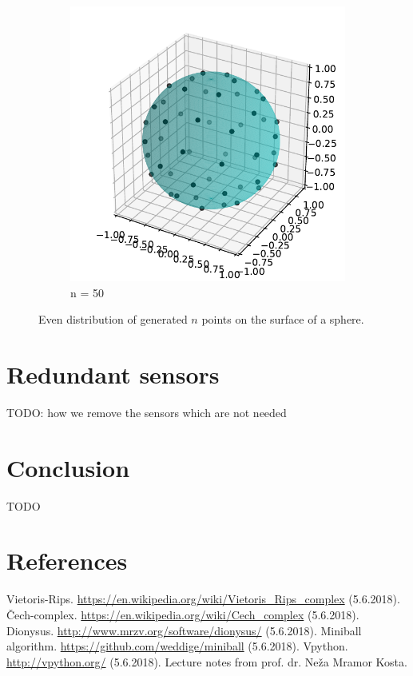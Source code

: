 \documentclass[a4paper, 12pt]{article}
\begin{document}
\begin{figure}[!ht]
\begin{subfigure}{.5\textwidth}
		\includegraphics[scale=0.75]{../images/generated1.pdf}
		\caption{n = 50}
	\end{subfigure}%
    \caption{Even distribution of generated $n$ points on the surface of a sphere.}
	
\end{figure}
\section{Redundant sensors}
TODO: how we remove the sensors which are not needed

\section{Conclusion}
TODO

\section{References}
\begin{thebibliography}{99}
	\bibitem{} Vietoris-Rips. \url{https://en.wikipedia.org/wiki/Vietoris_Rips_complex} (5.6.2018).
	Čech-complex. \url{https://en.wikipedia.org/wiki/Cech_complex} (5.6.2018).
	Dionysus. \url{http://www.mrzv.org/software/dionysus/} (5.6.2018).
	Miniball algorithm. \url{https://github.com/weddige/miniball} (5.6.2018).
	Vpython. \url{http://vpython.org/} (5.6.2018).
	 Lecture notes from prof. dr. Neža Mramor Kosta.
\end{thebibliography}
\end{document}
